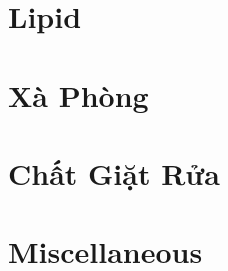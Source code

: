 \documentclass{article}
\begin{document}
\section{Lipid}


\section{Xà Phòng}


\section{Chất Giặt Rửa}


\section{Miscellaneous}


\printbibliography[heading=bibintoc]
	
\end{document}
